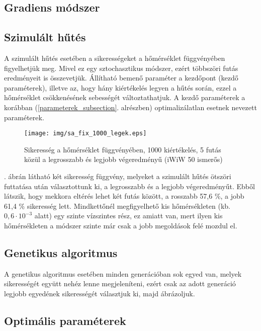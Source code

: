 \documentclass[12pt]{article}
\begin{document}
\subsection{Gradiens módszer}

\subsection{Szimulált hűtés}
A szimulált hűtés esetében a sikerességeket a hőmérséklet függvényében figyelhetjük meg. %
Mivel ez egy sztochasztikus módszer, ezért többszöri futás eredményeit is összevetjük. %
Állítható bemenő paraméter a kezdőpont (kezdő paraméterek), illetve az, hogy hány kiértékelés legyen a hűtés során, ezzel a hőmérséklet csökkenésének sebességét változtathatjuk. A kezdő paraméterek a korábban (\ref{parameterek_subsection}. alrészben) optimalizálatlan esetnek nevezett paraméterek. %
\begin{figure}[H]
	\centering
	\texttt{[image: img/sa\_fix\_1000\_legek.eps]}
	\caption{Sikeresség a hőmérséklet függvényében, 1000 kiértékelés, 5 futás közül a legrosszabb és legjobb végeredményű (iWiW 50 ismerős)}
	\label{sa_legek}
\end{figure}
. ábrán látható két sikeresség függvény, melyeket a szimulált hűtés ötszöri futtatása után választottunk ki, a legrosszabb és a legjobb végeredményűt. Ebből látszik, hogy mekkora eltérés lehet két futás között, a rosszabb 57,6 \%, a jobb 61,4 \% sikeresség lett. Mindkettőnél megfigyelhető kis hőmérsékleten (kb. $0,6 \cdot 10^{-3}$ alatt) egy szinte vízszintes rész, ez amiatt van, mert ilyen kis hőmérsékleten a módszer szinte már csak a jobb megoldások felé mozdul el.
\subsection{Genetikus algoritmus}
A genetikus algoritmus esetében minden generációban sok egyed van, melyek sikerességét együtt nehéz lenne megjeleníteni, ezért csak az adott generáció legjobb egyedének sikerességét választjuk ki, majd ábrázoljuk. %
\begin{figure}[H]
	\centering
	
	\caption{}
	\label{}
\end{figure}

\subsection{Optimális paraméterek}
\end{document}
